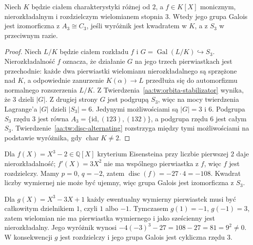 \begin{twierdzenie}\label{aa:tw:cubic-galois}
Niech $K$ będzie ciałem charakterystyki różnej od $2$,
a $f\in K[X]$ monicznym, nierozkładalnym i rozdzielczym
wielomianem stopnia $3$. Wtedy jego grupa Galois jest
izomorficzna z $A_3\cong C_3$, jeśli wyróżnik jest
kwadratem w $K$, a z $S_3$ w przeciwnym razie.
\end{twierdzenie}
\begin{proof}
Niech $L/K$ będzie ciałem rozkładu $f$ i
$G=\operatorname{Gal}(L/K)\hookrightarrow S_3$.
Nierozkładalność $f$ oznacza, że działanie $G$
na jego trzech pierwiastkach jest przechodnie:
każde dwa pierwiastki wielomianu nierozkładalnego
są sprzężone nad $K$, a odpowiednie zanurzenie
$K(\alpha)\to L$ przedłuża się do automorfizmu
normalnego rozszerzenia $L/K$.
Z Twierdzenia~\ref{aa:tw:orbita-stabilizator} wynika, że $3$ dzieli $|G|$.
Z drugiej strony $G$ jest podgrupą $S_3$,
więc na mocy twierdzenia Lagrange'a $|G|$ dzieli
$|S_3|=6$. Jedynymi możliwościami są $|G|=3$ i $6$.
Podgrupa $S_3$ rzędu $3$ jest równa
$A_3=\{\mathrm{id},(123),(132)\}$, a podgrupa rzędu $6$
jest całym $S_3$. Twierdzenie~\ref{aa:tw:disc-alternating}
rozstrzyga między tymi możliwościami na podstawie
wyróżnika, gdy $\operatorname{char}K\ne2$.
\end{proof}

\begin{przyklad}\label{aa:prz:cubic-groups}
Dla $f(X)=X^3-2\in\mathbb Q[X]$ kryterium Eisensteina
przy liczbie pierwszej $2$ daje nierozkładalność;
$f'(X)=3X^2$ nie ma wspólnego pierwiastka z $f$,
więc $f$ jest rozdzielczy. Mamy $p=0$, $q=-2$,
zatem $\operatorname{disc}(f)=-27\cdot4=-108$.
Kwadrat liczby wymiernej nie może być ujemny,
więc grupa Galois jest izomorficzna z $S_3$.

Dla $g(X)=X^3-3X+1$ każdy ewentualny wymierny
pierwiastek musi być całkowitym dzielnikiem $1$,
czyli $1$ albo $-1$. Tymczasem $g(1)=-1$,
$g(-1)=3$, zatem wielomian nie ma pierwiastka
wymiernego i jako sześcienny jest nierozkładalny.
Jego wyróżnik wynosi
$-4(-3)^3-27=108-27=81=9^2\ne0$.
W konsekwencji $g$ jest rozdzielczy i jego grupa
Galois jest cykliczna rzędu $3$.
\end{przyklad}

